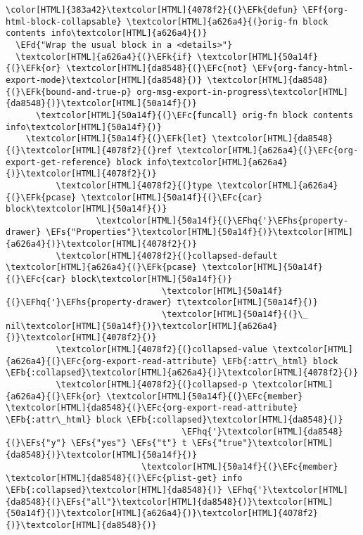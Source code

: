\documentclass{scrartcl}
\newcommand{\EFk}[1]{\textcolor{EFk}{#1}} %
\newcommand{\EFd}[1]{\textcolor{EFd}{\textit{#1}}} %
\newcommand{\EFs}[1]{\textcolor{EFs}{#1}} %
\newcommand{\EFb}[1]{\textcolor{EFb}{#1}} %
\newcommand{\EFc}[1]{\textcolor{EFc}{#1}} %
\newcommand{\EFv}[1]{\textcolor{EFv}{#1}} %
\newcommand{\EFf}[1]{\textcolor{EFf}{#1}} %
\newcommand{\EFhq}[1]{\textcolor{EFhq}{#1}} %
\newcommand{\EFhs}[1]{\textcolor{EFhs}{#1}} %
\begin{document}
\begin{Code}
\begin{Verbatim}[]
\color[HTML]{383a42}\textcolor[HTML]{4078f2}{(}\EFk{defun} \EFf{org-html-block-collapsable} \textcolor[HTML]{a626a4}{(}orig-fn block contents info\textcolor[HTML]{a626a4}{)}
  \EFd{"Wrap the usual block in a <details>"}
  \textcolor[HTML]{a626a4}{(}\EFk{if} \textcolor[HTML]{50a14f}{(}\EFk{or} \textcolor[HTML]{da8548}{(}\EFc{not} \EFv{org-fancy-html-export-mode}\textcolor[HTML]{da8548}{)} \textcolor[HTML]{da8548}{(}\EFk{bound-and-true-p} org-msg-export-in-progress\textcolor[HTML]{da8548}{)}\textcolor[HTML]{50a14f}{)}
      \textcolor[HTML]{50a14f}{(}\EFc{funcall} orig-fn block contents info\textcolor[HTML]{50a14f}{)}
    \textcolor[HTML]{50a14f}{(}\EFk{let} \textcolor[HTML]{da8548}{(}\textcolor[HTML]{4078f2}{(}ref \textcolor[HTML]{a626a4}{(}\EFc{org-export-get-reference} block info\textcolor[HTML]{a626a4}{)}\textcolor[HTML]{4078f2}{)}
          \textcolor[HTML]{4078f2}{(}type \textcolor[HTML]{a626a4}{(}\EFk{pcase} \textcolor[HTML]{50a14f}{(}\EFc{car} block\textcolor[HTML]{50a14f}{)}
                  \textcolor[HTML]{50a14f}{(}\EFhq{'}\EFhs{property-drawer} \EFs{"Properties"}\textcolor[HTML]{50a14f}{)}\textcolor[HTML]{a626a4}{)}\textcolor[HTML]{4078f2}{)}
          \textcolor[HTML]{4078f2}{(}collapsed-default \textcolor[HTML]{a626a4}{(}\EFk{pcase} \textcolor[HTML]{50a14f}{(}\EFc{car} block\textcolor[HTML]{50a14f}{)}
                               \textcolor[HTML]{50a14f}{(}\EFhq{'}\EFhs{property-drawer} t\textcolor[HTML]{50a14f}{)}
                               \textcolor[HTML]{50a14f}{(}\_ nil\textcolor[HTML]{50a14f}{)}\textcolor[HTML]{a626a4}{)}\textcolor[HTML]{4078f2}{)}
          \textcolor[HTML]{4078f2}{(}collapsed-value \textcolor[HTML]{a626a4}{(}\EFc{org-export-read-attribute} \EFb{:attr\_html} block \EFb{:collapsed}\textcolor[HTML]{a626a4}{)}\textcolor[HTML]{4078f2}{)}
          \textcolor[HTML]{4078f2}{(}collapsed-p \textcolor[HTML]{a626a4}{(}\EFk{or} \textcolor[HTML]{50a14f}{(}\EFc{member} \textcolor[HTML]{da8548}{(}\EFc{org-export-read-attribute} \EFb{:attr\_html} block \EFb{:collapsed}\textcolor[HTML]{da8548}{)}
                                   \EFhq{'}\textcolor[HTML]{da8548}{(}\EFs{"y"} \EFs{"yes"} \EFs{"t"} t \EFs{"true"}\textcolor[HTML]{da8548}{)}\textcolor[HTML]{50a14f}{)}
                           \textcolor[HTML]{50a14f}{(}\EFc{member} \textcolor[HTML]{da8548}{(}\EFc{plist-get} info \EFb{:collapsed}\textcolor[HTML]{da8548}{)} \EFhq{'}\textcolor[HTML]{da8548}{(}\EFs{"all"}\textcolor[HTML]{da8548}{)}\textcolor[HTML]{50a14f}{)}\textcolor[HTML]{a626a4}{)}\textcolor[HTML]{4078f2}{)}\textcolor[HTML]{da8548}{)}

\end{Verbatim}
\end{Code}
\end{document}
